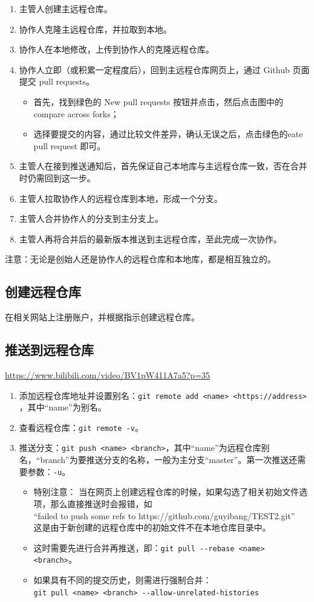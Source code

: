 \begin{enumerate}
\item  主管人创建主远程仓库。
\item 协作人克隆主远程仓库，并拉取到本地。
\item 协作人在本地修改，上传到协作人的克隆远程仓库。
\item 协作人立即（或积累一定程度后），回到主远程仓库网页上，通过 Github 页面提交 pull requests。
\begin{itemize}
\item 首先，找到绿色的 New pull requests 按钮并点击，然后点击图中的 compare across forks；
\item 选择要提交的内容，通过比较文件差异，确认无误之后，点击绿色的eate pull request 即可。
\end{itemize}
\item 主管人在接到推送通知后，首先保证自己本地库与主远程仓库一致，否在合并时仍需回到这一步。
\item 主管人拉取协作人的远程仓库到本地，形成一个分支。
\item 主管人合并协作人的分支到主分支上。
\item 主管人再将合并后的最新版本推送到主远程仓库，至此完成一次协作。
\end{enumerate}
注意：无论是创始人还是协作人的远程仓库和本地库，都是相互独立的。


\subsection{创建远程仓库}
在相关网站上注册账户，并根据指示创建远程仓库。



\subsection{推送到远程仓库}
\url{https://www.bilibili.com/video/BV1pW411A7a5?p=35}
\begin{enumerate}
\item 添加远程仓库地址并设置别名：\verb|git remote add <name> <https://address> |，其中“name”为别名。
\item 查看远程仓库：\verb|git remote -v|。
\item 推送分支：\verb|git push <name> <branch>|，其中“name”为远程仓库别名，“branch”为要推送分支的名称，一般为主分支“master”。第一次推送还需要参数：\verb|-u|。
\begin{itemize}
\item 特别注意： 当在网页上创建远程仓库的时候，如果勾选了相关初始文件选项，那么直接推送时会报错，如\\
“failed to push some refs to https://github.com/guyibang/TEST2.git”\\
这是由于新创建的远程仓库中的初始文件不在本地仓库目录中。
\item 这时需要先进行合并再推送，即：\verb|git pull --rebase <name> <branch>|。
\item 如果具有不同的提交历史，则需进行强制合并：\\ 
\verb|git pull <name> <branch> --allow-unrelated-histories |
\end{itemize}
\end{enumerate}




